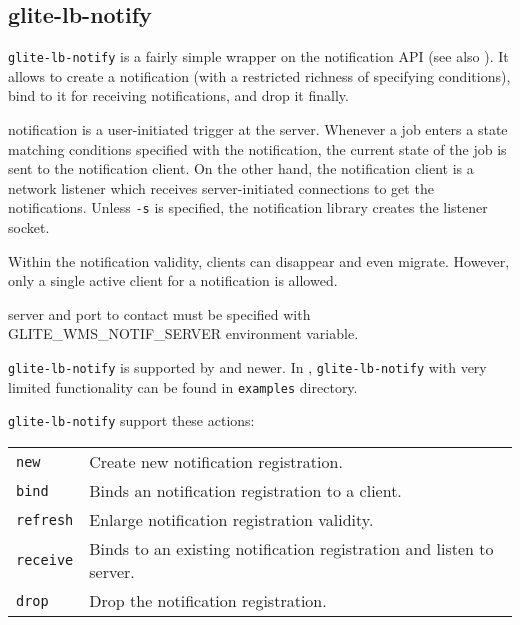 %
%
\subsection{glite-lb-notify}
\label{s:lb-notify}

\verb'glite-lb-notify' is a fairly simple wrapper on the \LB notification API
(see also \cite{lbdg}).
It allows to create a notification (with a restricted richness of specifying 
conditions), bind to it for receiving notifications, and drop it finally.

\LB notification is a user-initiated trigger at the server.
Whenever a job enters a state matching conditions specified with the notification,
the current state of the job is sent to the notification client.
On the other hand, the notification client is a network listener
which receives server-initiated connections to get the notifications.
Unless \verb'-s' is specified, the notification library creates the listener
socket.

Within the notification validity, clients can disappear and even migrate.
However, only a single active client for a notification is allowed.

\LB server and port to contact must be specified with GLITE\_WMS\_NOTIF\_SERVER 
environment variable.

\verb'glite-lb-notify' is supported by  and newer. In , \verb'glite-lb-notify' 
with very limited functionality can be found in \verb'examples' directory.

\verb'glite-lb-notify' support these actions:

\begin{tabularx}{\textwidth}{lX}
\texttt{new} & Create new notification registration.\\
\texttt{bind} &  Binds an notification registration to a client.\\
\texttt{refresh} &  Enlarge notification registration validity.\\
\texttt{receive}  & Binds to an existing notification registration and listen to
server.\\
\texttt{drop}     & Drop the notification registration.\\
\end{tabularx}

